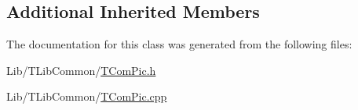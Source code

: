\subsection*{Additional Inherited Members}


The documentation for this class was generated from the following files\+:\begin{DoxyCompactItemize}
\item 
Lib/\+T\+Lib\+Common/\hyperlink{_t_com_pic_8h}{T\+Com\+Pic.\+h}\item 
Lib/\+T\+Lib\+Common/\hyperlink{_t_com_pic_8cpp}{T\+Com\+Pic.\+cpp}\end{DoxyCompactItemize}
